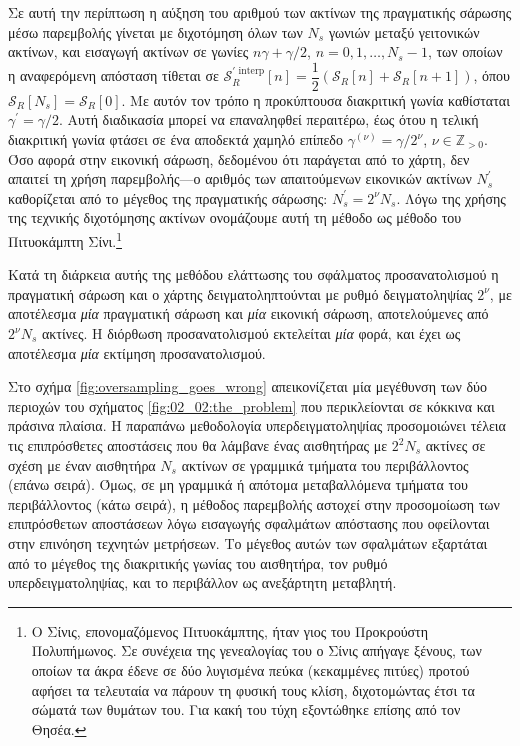 Σε αυτή την περίπτωση η αύξηση του αριθμού των ακτίνων της πραγματικής σάρωσης
μέσω παρεμβολής γίνεται με διχοτόμηση όλων των $N_s$ γωνιών μεταξύ γειτονικών
ακτίνων, και εισαγωγή ακτίνων σε γωνίες
$n\gamma + \gamma/2$, $n = 0,1,\dots,N_s-1$, των οποίων η αναφερόμενη απόσταση
τίθεται σε
$\mathcal{S}_R^{\prime\text{\ interp}}[n] = \dfrac{1}{2}(\mathcal{S}_R[n] + \mathcal{S}_R[n+1])$,
όπου $\mathcal{S}_R[N_s] = \mathcal{S}_R[0]$. Με αυτόν τον τρόπο η προκύπτουσα
διακριτική γωνία καθίσταται $\gamma^\prime = \gamma / 2$. Αυτή διαδικασία
μπορεί να επαναληφθεί περαιτέρω, έως ότου η τελική διακριτική γωνία φτάσει σε
ένα αποδεκτά χαμηλό επίπεδο $\gamma^{(\nu)} = \gamma / 2^\nu$, $\nu \in
\mathbb{Z}_{> 0}$. Όσο αφορά στην εικονική σάρωση, δεδομένου ότι παράγεται από
το χάρτη, δεν απαιτεί τη χρήση παρεμβολής---ο αριθμός των απαιτούμενων
εικονικών ακτίνων $N_s^\prime$ καθορίζεται από το μέγεθος της πραγματικής
σάρωσης: $N_s^\prime = 2^\nu N_s$.  Λόγω της χρήσης της τεχνικής διχοτόμησης
ακτίνων ονομάζουμε αυτή τη μέθοδο ως μέθοδο του Πιτυοκάμπτη Σίνι.\footnote{Ο
Σίνις, επονομαζόμενος Πιτυοκάμπτης, ήταν γιος του Προκρούστη Πολυπήμωνος. Σε
συνέχεια της γενεαλογίας του ο Σίνις απήγαγε ξένους, των οποίων τα άκρα έδενε
σε δύο λυγισμένα πεύκα (κεκαμμένες πιτύες) προτού αφήσει τα τελευταία να πάρουν
τη φυσική τους κλίση, διχοτομώντας έτσι τα σώματά των θυμάτων του. Για κακή του
τύχη εξοντώθηκε επίσης από τον Θησέα.}

\begin{remark}
  \label{rem:sizes_incorrect}
  Κατά τη διάρκεια αυτής της μεθόδου ελάττωσης του σφάλματος προσανατολισμού η
  πραγματική σάρωση και ο χάρτης δειγματοληπτούνται με ρυθμό δειγματοληψίας
  $2^\nu$, με αποτέλεσμα \textit{μία} πραγματική σάρωση και \textit{μία}
  εικονική σάρωση, αποτελούμενες από $2^\nu N_s$ ακτίνες. Η διόρθωση
  προσανατολισμού εκτελείται \textit{μία} φορά, και έχει ως αποτέλεσμα
  \textit{μία} εκτίμηση προσανατολισμού.
\end{remark}

Στο σχήμα \ref{fig:oversampling_goes_wrong} απεικονίζεται μία μεγέθυνση των δύο
περιοχών του σχήματος \ref{fig:02_02:the_problem} που περικλείονται σε κόκκινα
και πράσινα πλαίσια. Η παραπάνω μεθοδολογία υπερδειγματοληψίας προσομοιώνει
τέλεια τις επιπρόσθετες αποστάσεις που θα λάμβανε ένας αισθητήρας με $2^2 N_s$
ακτίνες σε σχέση με έναν αισθητήρα $N_s$ ακτίνων σε γραμμικά τμήματα του
περιβάλλοντος (επάνω σειρά). Όμως, σε μη γραμμικά ή απότομα μεταβαλλόμενα
τμήματα του περιβάλλοντος (κάτω σειρά), η μέθοδος παρεμβολής αστοχεί στην
προσομοίωση των επιπρόσθετων αποστάσεων λόγω εισαγωγής σφαλμάτων απόστασης που
οφείλονται στην επινόηση τεχνητών μετρήσεων. Το μέγεθος αυτών των σφαλμάτων
εξαρτάται από το μέγεθος της διακριτικής γωνίας του αισθητήρα, τον ρυθμό
υπερδειγματοληψίας, και το περιβάλλον ως ανεξάρτητη μεταβλητή.

